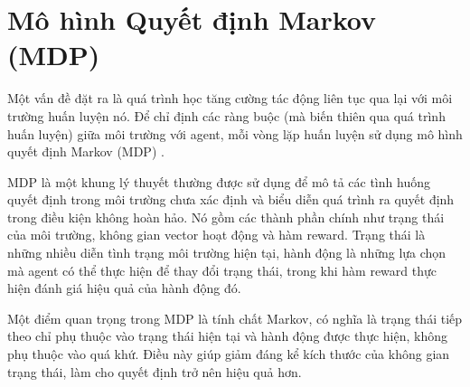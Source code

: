 \section{Mô hình Quyết định Markov (MDP)}

Một vấn đề đặt ra là quá trình học tăng cường tác động liên tục qua lại với môi trường huấn luyện nó. Để chỉ định các ràng buộc (mà biến thiên qua quá trình huấn luyện) giữa môi trường với agent, mỗi vòng lặp huấn luyện sử dụng mô hình quyết định Markov (MDP) \cite{levin1998using}.

MDP là một khung lý thuyết thường được sử dụng để mô tả các tình huống quyết định trong môi trường chưa xác định và biểu diễn quá trình ra quyết định trong điều kiện không hoàn hảo. Nó gồm các thành phần chính như trạng thái của môi trường, không gian vector hoạt động và hàm reward. Trạng thái là những nhiều diễn tình trạng môi trường hiện tại, hành động là những lựa chọn mà agent có thể thực hiện để thay đổi trạng thái, trong khi hàm reward thực hiện đánh giá hiệu quả của hành động đó.

Một điểm quan trọng trong MDP là tính chất Markov, có nghĩa là trạng thái tiếp theo chỉ phụ thuộc vào trạng thái hiện tại và hành động được thực hiện, không phụ thuộc vào quá khứ. Điều này giúp giảm đáng kể kích thước của không gian trạng thái, làm cho quyết định trở nên hiệu quả hơn.


